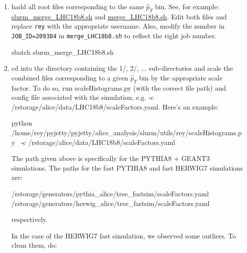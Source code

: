 \documentclass[12pt]{article}
\begin{document}
\begin{enumerate}
\item hadd all root files corresponding to the same $\hat{p}_T$ bin.
See, for example: \href{https://github.com/reynier0611/pyjetty/blob/master/pyjetty/alice_analysis/slurm/utils/rey/slurm_merge_LHC18b8.sh}{slurm\_merge\_LHC18b8.sh} and
\href{https://github.com/reynier0611/pyjetty/blob/master/pyjetty/alice_analysis/slurm/utils/rey/merge_LHC18b8.sh}{merge\_LHC18b8.sh}.
Edit both files and replace \verb|rey| with the appropriate username. Also, modify the number in \verb|JOB_ID=209384| in \verb|merge_LHC18b8.sh| to reflect the right job number.

\begin{tcolorbox}
\begin{verbnobox}[\scriptsize]
sbatch slurm_merge_LHC18b8.sh
\end{verbnobox}  
\end{tcolorbox}

\item cd into the directory containing the 1/, 2/, ... sub-directories and scale the combined files corresponding to a given $\hat{p}_T$ bin by the appropriate scale factor.
To do so, run scaleHistograms.py (with the correct file path) and config file associated with the simulation, e.g. -c /rstorage/alice/data/LHC18b8/scaleFactors.yaml.
Here's an example:

\begin{tcolorbox}
\begin{verbnobox}[\scriptsize]
python /home/rey/pyjetty/pyjetty/alice_analysis/slurm/utils/rey/scaleHistograms.py \
-c /rstorage/alice/data/LHC18b8/scaleFactors.yaml
\end{verbnobox}  
\end{tcolorbox}

The path given above is specifically for the PYTHIA8 + GEANT3 simulations. The paths for the fast PYTHIA8 and fast HERWIG7 simulations are:

\begin{tcolorbox}
\begin{verbnobox}[\scriptsize]
/rstorage/generators/pythia_alice/tree_fastsim/scaleFactors.yaml
/rstorage/generators/herwig_alice/tree_fastsim/scaleFactors.yaml
\end{verbnobox}  
\end{tcolorbox}

respectively.

In the case of the HERWIG7 fast simulation, we observed some outliers. To clean them, do:


\end{enumerate}
\end{document}
